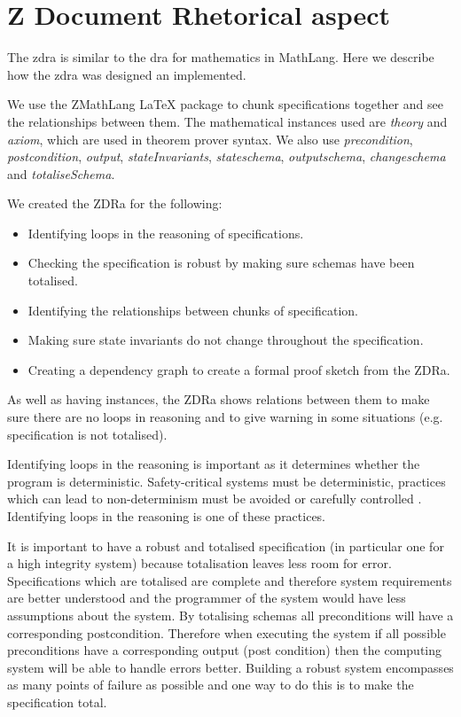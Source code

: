 \chapter{Z Document Rhetorical aspect}
\label{ch:zdra}
The \gls{zdra} is similar to the \gls{dra} for mathematics in MathLang. Here we describe how
the \gls{zdra} was designed an implemented. 

We use the ZMathLang \LaTeX{} package to chunk specifications together and see
the relationships between them. The mathematical instances used are
\textit{theory} and \textit{axiom}, which are used in theorem prover syntax. We
also use \textit{precondition}, \textit{postcondition}, \textit{output},
\textit{stateInvariants}, \textit{stateschema}, \textit{outputschema},
\textit{changeschema} and \textit{totaliseSchema}.

We created the ZDRa for the following:

\begin{itemize}

\item Identifying loops in the reasoning of specifications.
\item Checking the specification is robust by making sure schemas have been
totalised.
\item Identifying the relationships between chunks of specification.
\item Making sure state invariants do not change throughout the specification.
\item Creating a dependency graph to create a formal proof sketch from the ZDRa.
\end{itemize}

As well as having instances, the ZDRa shows relations between them to make sure
there are no loops in reasoning and to give warning in some situations (e.g.
specification is not totalised).

Identifying loops in the reasoning is important as it determines whether the
program is deterministic. Safety-critical systems must be deterministic,
practices which can lead to non-determinism must be avoided or carefully
controlled \cite{rierson2013developing}. Identifying loops in the reasoning is one of these practices. 

It is important to have a robust and totalised specification (in particular one
for a high integrity system) because totalisation leaves less room for error.
Specifications which are totalised are complete and therefore system
requirements are better understood and the programmer of the system would have
less assumptions about the system.
By totalising schemas all preconditions will have a corresponding postcondition.
Therefore when executing the system if all possible preconditions have a
corresponding output (post condition) then the computing system will be able to
handle errors better. Building a robust system encompasses as many points of
failure  as possible and one way to do this is to make the specification total.



